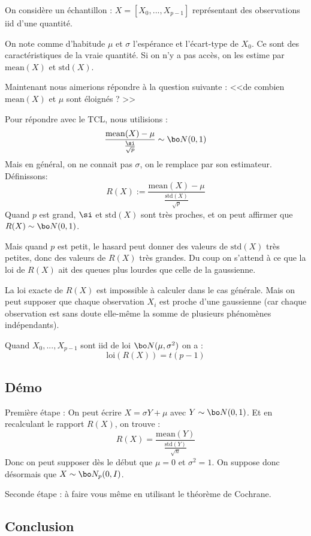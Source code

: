 \documentclass{article}
\def\std{\text{std}}
\def\mean{\mathrm{mean}}
\begin{document}
 
On considère un échantillon :  $X = [X_0,...,X_{p-1}]$  représentant des observations iid d'une quantité.

On note comme d'habitude $\mu$ et  $\sigma$ l'espérance et l'écart-type de $X_0$.  Ce sont des caractéristiques de la vraie quantité. Si on n'y a pas accès, on les estime par  $\mean(X) $ et $\std(X)$.    

Maintenant nous aimerions répondre à la question suivante :
        <<de combien  $\mean(X)$ et $\mu$ sont éloignés ? >>

Pour répondre avec le TCL, nous utilisions : 
$$
\frac{\mean(X) - \mu }{ \frac{\si}{\sqrt{p}}  }   \sim \bo N(0,1) 
$$
Mais en général, on ne connait pas $\sigma$, on le remplace par son estimateur. Définissons: 
$$
R(X) := \frac{\mean(X) - \mu }{ \frac{ \std(X) }{\sqrt{p}}  }  
$$
Quand $p$ est grand, $\si$ et $\std(X)$ sont très proches, et on peut affirmer que $R(X)\sim \bo N(0,1) $.  

Mais quand  $p$ est petit, le hasard peut donner des valeurs de $\std(X)$ très petites, donc des valeurs de $R(X)$ très grandes.  Du coup on s'attend à ce que la loi de $R(X)$  ait des queues plus lourdes que celle de la gaussienne.


La loi exacte de $R(X)$  est impossible à calculer dans le cas générale.
Mais on peut supposer que chaque observation $X_i$  est proche d'une gaussienne
(car chaque observation est sans doute elle-même la somme de plusieurs phénomènes indépendants). 

\begin{theorem} Quand $X_0,...,X_{p-1}$ sont iid de loi $\bo N(\mu,\sigma^2)$ on a : 
$$
\mathrm{loi} ( R(X) )   = t( p-1) 
$$
\end{theorem}


\subsection{Démo}

Première étape : On peut écrire $X = \sigma Y + \mu$  avec $Y \sim \bo N(0,1)$. Et en recalculant le rapport $R(X)$, on trouve :
$$
  R(X)= \frac{\mean(Y) }{ \frac{\std(Y)}{\sqrt n}  }
$$
Donc on peut supposer dès le début que $\mu=0$ et $\sigma^2=1$.    On suppose donc désormais que $X \sim \bo N_p(0,I)$. 


Seconde étape : à faire vous même en utilisant le théorème de Cochrane. 



\subsection{Conclusion}
\end{document}
